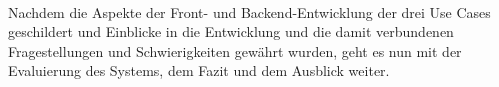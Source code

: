 \\ 
\linebreak
Nachdem die Aspekte der Front- und Backend-Entwicklung der drei Use Cases geschildert und Einblicke in die Entwicklung und die damit verbundenen Fragestellungen 
und Schwierigkeiten gewährt wurden, geht es nun mit der Evaluierung des Systems, dem Fazit und dem Ausblick weiter.

